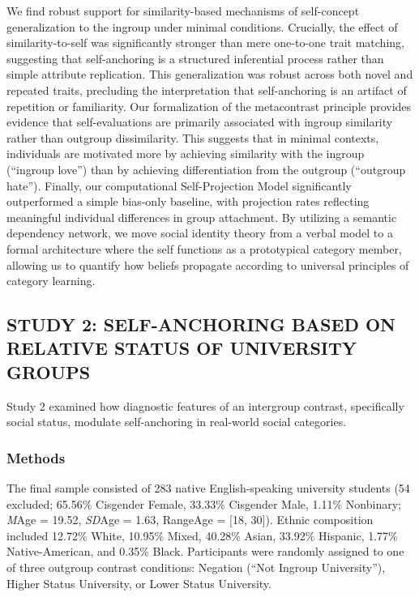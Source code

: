\documentclass[
  man,
  longtable,
  nolmodern,
  notxfonts,
  notimes,
  man]{apa7}
\begin{document}
We find robust support for similarity-based mechanisms of self-concept
generalization to the ingroup under minimal conditions. Crucially, the
effect of similarity-to-self was significantly stronger than mere
one-to-one trait matching, suggesting that self-anchoring is a
structured inferential process rather than simple attribute replication.
This generalization was robust across both novel and repeated traits,
precluding the interpretation that self-anchoring is an artifact of
repetition or familiarity. Our formalization of the metacontrast
principle provides evidence that self-evaluations are primarily
associated with ingroup similarity rather than outgroup dissimilarity.
This suggests that in minimal contexts, individuals are motivated more
by achieving similarity with the ingroup (``ingroup love'') than by
achieving differentiation from the outgroup (``outgroup hate'').
Finally, our computational Self-Projection Model significantly
outperformed a simple bias-only baseline, with projection rates
reflecting meaningful individual differences in group attachment. By
utilizing a semantic dependency network, we move social identity theory
from a verbal model to a formal architecture where the self functions as
a prototypical category member, allowing us to quantify how beliefs
propagate according to universal principles of category learning.

\subsection{STUDY 2: SELF-ANCHORING BASED ON RELATIVE STATUS OF
UNIVERSITY
GROUPS}\label{study-2-self-anchoring-based-on-relative-status-of-university-groups}

Study 2 examined how diagnostic features of an intergroup contrast,
specifically social status, modulate self-anchoring in real-world social
categories.

\subsubsection{Methods}\label{methods-1}

The final sample consisted of 283 native English-speaking university
students (54 excluded; 65.56\% Cisgender Female, 33.33\% Cisgender Male,
1.11\% Nonbinary; \emph{M}Age = 19.52, \emph{SD}Age = 1.63, RangeAge =
{[}18, 30{]}). Ethnic composition included 12.72\% White, 10.95\% Mixed,
40.28\% Asian, 33.92\% Hispanic, 1.77\% Native-American, and 0.35\%
Black. Participants were randomly assigned to one of three outgroup
contrast conditions: Negation (``Not Ingroup University''), Higher
Status University, or Lower Status University.
\end{document}
